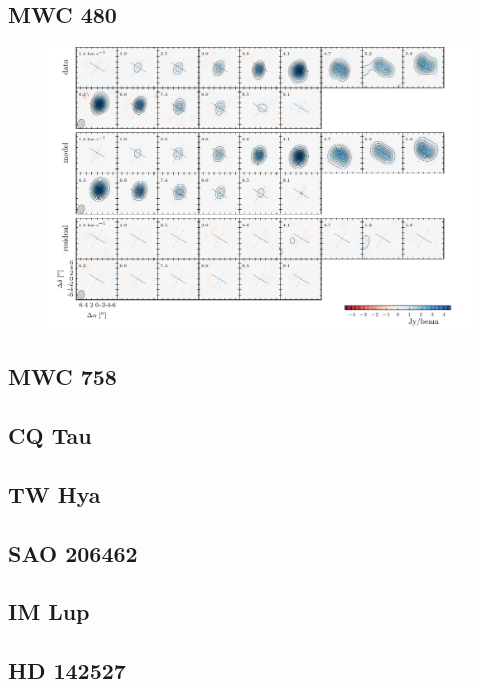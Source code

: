 \documentclass[twocolumn]{aastex6}
\begin{document}
\subsection{MWC 480}
\begin{figure}[htb]
\begin{center}
  \includegraphics{MWC480.pdf}
  \end{center}
\end{figure}

\subsection{MWC 758}

\subsection{CQ Tau}

\subsection{TW Hya}

\subsection{SAO 206462}

\subsection{IM Lup}

\subsection{HD 142527}
\end{document}
